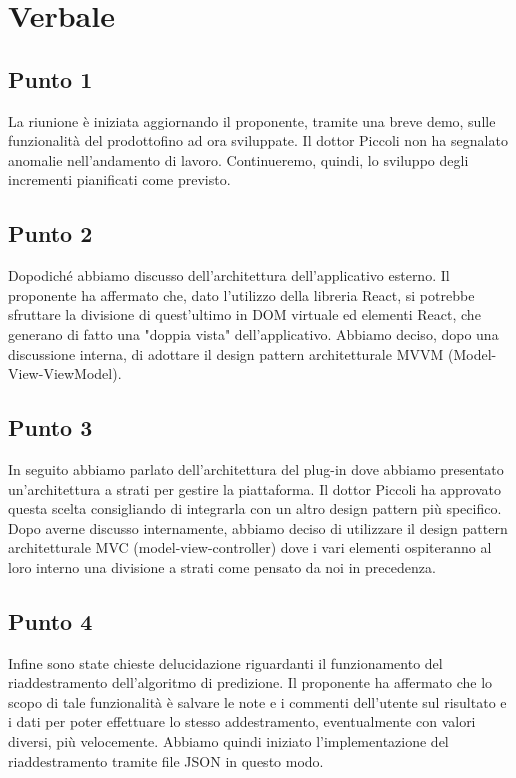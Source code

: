\section{Verbale}
        \subsection{Punto 1}
            La riunione è iniziata aggiornando il proponente, tramite una breve demo, sulle funzionalità del prodotto\glosp fino ad ora sviluppate. Il dottor Piccoli non ha segnalato anomalie nell'andamento di lavoro. Continueremo, quindi, lo sviluppo degli incrementi pianificati come previsto.
        \subsection{Punto 2}
            Dopodiché abbiamo discusso dell'architettura dell'applicativo esterno. Il proponente ha affermato che, dato l'utilizzo della libreria React, si potrebbe sfruttare la divisione di quest'ultimo in DOM virtuale ed elementi React, che generano di fatto una "doppia vista" dell'applicativo. Abbiamo deciso, dopo una discussione interna, di adottare il design pattern architetturale MVVM (Model-View-ViewModel).
        \subsection{Punto 3}
            In seguito abbiamo parlato dell'architettura del plug-in dove abbiamo presentato un'architettura a strati per gestire la piattaforma. Il dottor Piccoli ha approvato questa scelta consigliando di integrarla con un altro design pattern più specifico. Dopo averne discusso internamente, abbiamo deciso di utilizzare il design pattern architetturale MVC (model-view-controller) dove i vari elementi ospiteranno al loro interno una divisione a strati come pensato da noi in precedenza.
        \subsection{Punto 4}
            Infine sono state chieste delucidazione riguardanti il funzionamento del riaddestramento dell'algoritmo di predizione. Il proponente ha affermato che lo scopo di tale funzionalità è salvare le note e i commenti dell'utente sul risultato e i dati per poter effettuare lo stesso addestramento, eventualmente con valori diversi, più velocemente. Abbiamo quindi iniziato l'implementazione del riaddestramento tramite file JSON in questo modo.